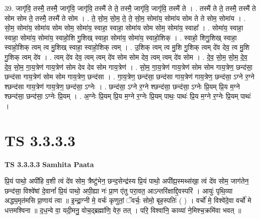 \documentclass[17pt]{extarticle}
\begin{document}
39. जागृ॑वि॒ तस्मै॒ तस्मै॒ जागृ॑वि॒ जागृ॑वि॒ तस्मै॑ ते ते॒ तस्मै॒ जागृ॑वि॒ जागृ॑वि॒ तस्मै॑ ते । . तस्मै॑ ते ते॒ तस्मै॒ तस्मै॑ ते सोम सोम ते॒ तस्मै॒ तस्मै॑ ते सोम । . ते॒ सो॒म॒ सो॒म॒ ते॒ ते॒ सो॒म॒ सोमा॑य॒ सोमा॑य सोम ते ते सोम॒ सोमा॑य । . सो॒म॒ सोमा॑य॒ सोमा॑य सोम सोम॒ सोमा॑य॒ स्वाहा॒ स्वाहा॒ सोमा॑य सोम सोम॒ सोमा॑य॒ स्वाहा᳚ । . सोमा॑य॒ स्वाहा॒ स्वाहा॒ सोमा॑य॒ सोमा॑य॒ स्वाहो॒शि गु॒शिख् स्वाहा॒ सोमा॑य॒ सोमा॑य॒ स्वाहो॒शिक् । . स्वाहो॒ शिगु॒शिख् स्वाहा॒ स्वाहो॒शिक् त्वम् त्व मु॒शिख् स्वाहा॒ स्वाहो॒शिक् त्वम् । . उ॒शिक् त्वम् त्व मु॒शि गु॒शिक् त्वम् दे॑व देव॒ त्व मु॒शि गु॒शिक् त्वम् दे॑व । . त्वम् दे॑व देव॒ त्वम् त्वम् दे॑व सोम सोम देव॒ त्वम् त्वम् दे॑व सोम । . दे॒व॒ सो॒म॒ सो॒म॒ दे॒व॒ दे॒व॒ सो॒म॒ गा॒य॒त्रेण॑ गाय॒त्रेण॑ सोम देव देव सोम गाय॒त्रेण॑ । . सो॒म॒ गा॒य॒त्रेण॑ गाय॒त्रेण॑ सोम सोम गाय॒त्रेण॒ छन्द॑सा॒ छन्द॑सा गाय॒त्रेण॑ सोम सोम गाय॒त्रेण॒ छन्द॑सा । . गा॒य॒त्रेण॒ छन्द॑सा॒ छन्द॑सा गाय॒त्रेण॑ गाय॒त्रेण॒ छन्द॑सा॒ ऽग्ने र॒ग्ने श्छन्द॑सा गाय॒त्रेण॑ गाय॒त्रेण॒ छन्द॑सा॒ ऽग्नेः । . छन्द॑सा॒ ऽग्ने र॒ग्ने श्छन्द॑सा॒ छन्द॑सा॒ ऽग्नेः प्रि॒यम् प्रि॒य म॒ग्ने श्छन्द॑सा॒ छन्द॑सा॒ ऽग्नेः प्रि॒यम् । . अ॒ग्नेः प्रि॒यम् प्रि॒य म॒ग्ने र॒ग्नेः प्रि॒यम् पाथः॒ पाथः॑ प्रि॒य म॒ग्ने र॒ग्नेः प्रि॒यम् पाथः॑ । \newline
\pagebreak
{}

\section{ TS 3.3.3.3 }

\textbf{TS 3.3.3.3 } \newline
\textbf{Samhita Paata} \newline

प्रि॒यं पाथो॒ अपी॑हि व॒शी त्वं दे॑व सोम॒ त्रैष्टु॑भेन॒ छन्द॒सेन्द्र॑स्य प्रि॒यं पाथो॒ अपी᳚ह्य॒स्मथ्स॑खा॒ त्वं दे॑व सोम॒ जाग॑तेन॒ छन्द॑सा॒ विश्वे॑षां दे॒वानां᳚ प्रि॒यं पाथो॒ अपी॒ह्या नः॑ प्रा॒ण ए॑तु परा॒वत॒ आऽन्तरि॑क्षाद्दि॒वस्परि॑ । आयुः॑ पृथि॒व्या अद्ध्य॒मृत॑मसि प्रा॒णाय॑ त्वा ॥ इ॒न्द्रा॒ग्नी मे॒ वर्चः॑ कृणुतां॒ ॅवर्चः॒ सोमो॒ बृह॒स्पतिः॑ ( ) । वर्चो॑ मे॒ विश्वे॑दे॒वा वर्चो॑ मे धत्तमश्विना ॥ द॒ध॒न्वे वा॒ यदी॒मनु॒ वोच॒द्ब्रह्मा॑णि॒ वेरु॒ तत् । परि॒ विश्वा॑नि॒ काव्या॑ ने॒मिश्च॒क्रमि॑वा भवत् ॥ \newline
\end{document}
